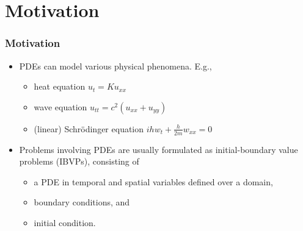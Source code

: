 \documentclass{beamer}
\begin{document}
\section{Motivation}

\begin{frame}
    \frametitle{Motivation}
    \begin{itemize} \setlength\itemsep{1em}
        \item PDEs can model various physical phenomena. E.g.,
        \begin{itemize}
            \item heat equation $u_t = Ku_{xx}$
            \item wave equation $u_{tt} = c^2(u_{xx}+u_{yy})$
            \item (linear) Schr\"{o}dinger equation $ihw_t + \frac{h}{2m}w_{xx}=0$
        \end{itemize}
        \item Problems involving PDEs are usually formulated as initial-boundary value problems (IBVPs), consisting of
        \begin{itemize}
            \item a PDE in temporal and spatial variables defined over a domain,
            \item boundary conditions, and
            \item initial condition.
        \end{itemize}
    \end{itemize}
\end{frame}
\end{document}
